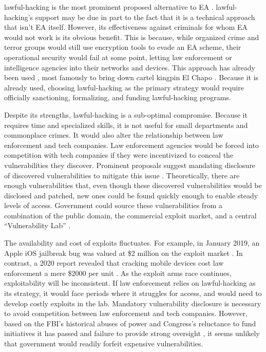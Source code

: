 \documentclass[conference]{IEEEtran}
\begin{document}
\Ac{lawful-hacking} is the most prominent proposed alternative to \ac{EA} \cite{bellovin_lawful_2013}
\cite{hennessey_lawful_2016} \cite{rozenshtein_wicked_2018} \cite{kerr_encryption_2017} \cite{soesanto_2018}.
\Ac{lawful-hacking}'s support may be due in part to the fact that it is a technical approach that isn't \ac{EA} itself.
However, its effectiveness against criminals for whom \ac{EA} would not work is its obvious benefit. This is because,
while organized crime and terror groups would still use encryption tools to evade an \ac{EA} scheme, their operational
security would fail at some point, letting law enforcement or intelligence agencies into their networks and devices.
This approach has already been used \cite{cox_2020}, most famously to bring down cartel kingpin El Chapo
\cite{feuer_chapo_2019}. Because it is already used, choosing \ac{lawful-hacking} as the primary strategy would require
officially sanctioning, formalizing, and funding \ac{lawful-hacking} programs.

Despite its strengths, \ac{lawful-hacking} is a sub-optimal compromise. Because it requires time and specialized skills,
it is not useful for small departments and commonplace crimes. It would also alter the relationship between law
enforcement and tech companies. Law enforcement agencies would be forced into competition with tech companies if they
were incentivized to conceal the vulnerabilities they discover. Prominent proposals suggest mandating disclosure of
discovered vulnerabilities to mitigate this issue \cite{bellovin_lawful_2013} \cite{hennessey_lawful_2016}.
Theoretically, there are enough vulnerabilities that, even though these discovered vulnerabilities would be disclosed and
patched, new ones could be found quickly enough to enable steady levels of access. Government could source these
vulnerabilities from a combination of the public domain, the commercial exploit market, and a central ``Vulnerability
Lab'' \cite{bellovin_lawful_2013}.

The availability and cost of exploits fluctuates. For example, in January 2019, an Apple iOS jailbreak bug was valued at
\$2 million on the exploit market \cite{goodin_zeroday_2019}. In contrast, a 2020 report revealed that cracking mobile
devices cost law enforcement a mere \$2000 per unit \cite{koepke_2020}. As the exploit arms race continues,
exploitability will be inconsistent. If law enforcement relies on \ac{lawful-hacking} as its strategy, it would face
periods where it struggles for access, and would need to develop costly exploits in the lab. Mandatory vulnerability
disclosure is necessary to avoid competition between law enforcement and tech companies. However, based on the
\ac{FBI}'s historical abuses of power \cite{shamsi_2011} and Congress's reluctance to fund initiatives it has passed
\cite{keller_internet_2019} and failure to provide strong oversight \cite{johnson_congressional_2004}, it seems unlikely
that government would readily forfeit expensive vulnerabilities.
\end{document}
